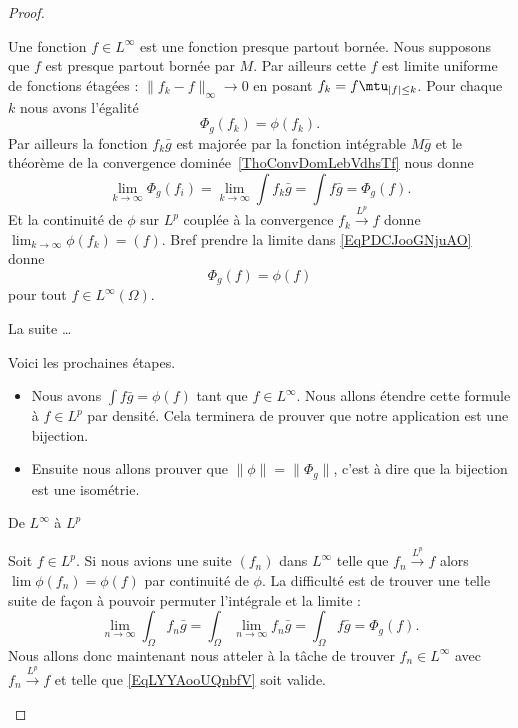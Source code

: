\begin{proof}
\begin{subproof}
            Une fonction \( f\in L^{\infty}\) est une fonction presque partout bornée. Nous supposons que \( f\) est presque partout bornée par \( M\). Par ailleurs cette \( f\) est limite uniforme de fonctions étagées : \( \| f_k-f \|_{\infty}\to 0\) en posant \( f_k=f\mtu_{| f |\leq k}\). Pour chaque \( k \) nous avons l'égalité
            \begin{equation}    \label{EqPDCJooGNjuAO}
                \Phi_g(f_k)=\phi(f_k).
            \end{equation}
            Par ailleurs la fonction \( f_k\bar g\) est majorée par la fonction intégrable \( M\bar g\) et le théorème de la convergence dominée~\ref{ThoConvDomLebVdhsTf} nous donne
            \begin{equation}
                \lim_{k\to \infty} \Phi_g(f_i)=\lim_{k\to \infty} \int f_k\bar g=\int f\bar g=\Phi_g(f).
            \end{equation}
            Et la continuité de \( \phi\) sur \( L^p\) couplée à la convergence \( f_k\stackrel{L^p}{\longrightarrow}f\) donne \( \lim_{k\to \infty} \phi(f_k)=(f)\). Bref prendre la limite dans \eqref{EqPDCJooGNjuAO} donne
            \begin{equation}
                \Phi_g(f)=\phi(f)
            \end{equation}
            pour tout \( f\in L^{\infty}(\Omega)\).

        \item[La suite \ldots]

            Voici les prochaines étapes.
            \begin{itemize}
                \item Nous avons \( \int f\bar g=\phi(f)\) tant que \( f\in L^{\infty}\). Nous allons étendre cette formule à \( f\in L^p\) par densité. Cela terminera de prouver que notre application est une bijection.
                \item Ensuite nous allons prouver que \( \| \phi \|=\| \Phi_g \|\), c'est à dire que la bijection est une isométrie.
            \end{itemize}

        \item[De \( L^{\infty}\) à \( L^p\)]

            Soit \( f\in L^p\). Si nous avions une suite \( (f_n) \) dans \( L^{\infty}\) telle que \( f_n\stackrel{L^p}{\longrightarrow}f\) alors \( \lim \phi(f_n)=\phi(f)\) par continuité de \( \phi\). La difficulté est de trouver une telle suite de façon à pouvoir permuter l'intégrale et la limite :
            \begin{equation}    \label{EqLYYAooUQnbfV}
                \lim_{n\to \infty} \int_{\Omega}f_n\bar g=\int_{\Omega}\lim_{n\to \infty} f_n\bar g=\int_{\Omega}f\bar g=\Phi_g(f).
            \end{equation}
            Nous allons donc maintenant nous atteler à la tâche de trouver \( f_n\in L^{\infty}\) avec \( f_n\stackrel{L^p}{\longrightarrow}f\) et telle que \eqref{EqLYYAooUQnbfV} soit valide.


\end{subproof}
\end{proof}
